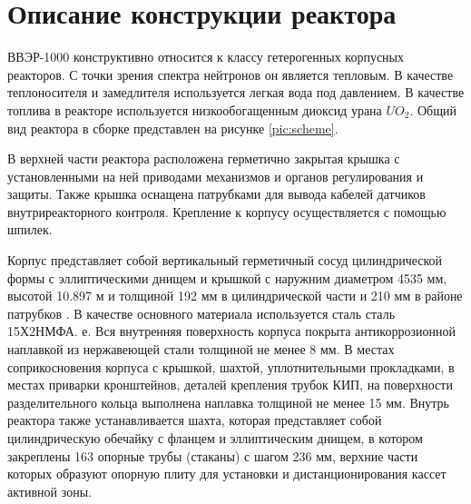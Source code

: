 


\section{Описание конструкции реактора}
ВВЭР-1000 конструктивно относится к классу гетерогенных корпусных реакторов. С точки зрения спектра нейтронов он является тепловым. В качестве теплоносителя и замедлителя используется легкая вода под давлением. В качестве топлива в реакторе используется низкообогащенным диоксид урана $UO_2$. Общий вид реактора в сборке представлен на рисунке \ref{pic:scheme}. 


В верхней части реактора расположена герметично закрытая крышка с установленными на ней приводами механизмов и органов регулирования и защиты. Также крышка оснащена патрубками для вывода кабелей датчиков внутриреакторного контроля. Крепление  к корпусу осуществляется с помощью шпилек. 

Корпус представляет собой вертикальный герметичный сосуд
цилиндрической формы с эллиптическими днищем и крышкой  с наружним диаметром 4535 мм, высотой 10.897 м и толщиной 192 мм в цилиндрической части и 210 мм в районе патрубков \cite{лескин2011физические}. В качестве основного материала используется сталь сталь 15Х2НМФА. е. Вся внутренняя поверхность корпуса покрыта
антикоррозионной наплавкой из нержавеющей стали толщиной не
менее 8 мм. В местах соприкосновения корпуса с крышкой, шахтой, уплотнительными прокладками, в местах приварки
кронштейнов, деталей крепления трубок КИП, на поверхности разделительного кольца выполнена наплавка толщиной не менее
15 мм. Внутрь реактора также устанавливается шахта, которая  представляет собой цилиндрическую обечайку с фланцем и эллиптическим днищем, в котором закреплены 163 опорные
трубы (стаканы) с шагом 236 мм, верхние части которых образуют
опорную плиту для установки и дистанционирования кассет активной зоны. 

